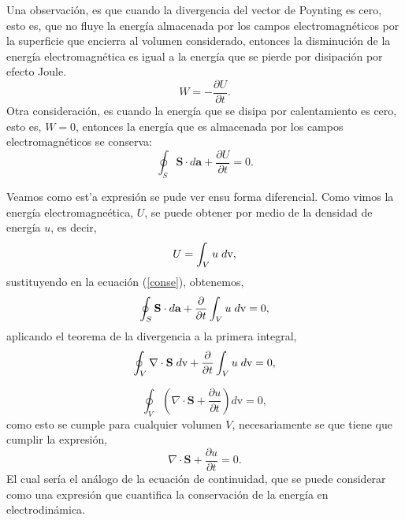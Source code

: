 \documentclass[11pt,fleqn]{book} %
\begin{document}
Una observaci\'on, es que cuando la divergencia del vector de Poynting es cero, esto es, que no fluye la energ\'ia almacenada por los campos electromagn\'eticos por la superficie que encierra al volumen considerado, entonces la disminuci\'on de la energ\'ia electromagn\'etica es igual a la energ\'ia que se pierde por disipaci\'on por efecto Joule.
\begin{equation}
W=-\frac{\partial U}{\partial t}.
\end{equation}
Otra consideraci\'on, es cuando la energ\'ia que se disipa por calentamiento es cero, esto es, $W=0$, entonces la energ\'ia que es almacenada por los campos electromagn\'eticos se conserva:
\begin{equation}
\oint_{S}\textbf{S}\cdot d\textbf{a}+\frac{\partial U}{\partial t}=0.\label{conse}
\end{equation}


\begin{obs}
 Veamos como est'a expresi\'on se pude ver ensu forma diferencial. Como vimos la energ\'ia electromagne\'etica, $U$, se puede obtener por medio de la densidad de energ\'ia $u$, es decir,
 \begin{equation*}
 U=\int_V u \hspace{1mm}d\text{v},
 \end{equation*}
sustituyendo en la ecuaci\'on (\ref{conse}), obtenemos,
 \begin{equation*}
\oint_{S}\textbf{S}\cdot d\textbf{a}+\frac{\partial }{\partial t}
 \int_V u \hspace{1mm}d\text{v}=0,
 \end{equation*}
aplicando el teorema de la divergencia a la primera integral,
 \begin{equation*}
\oint_{V}\nabla \cdot\textbf{S}\hspace{1mm}d\text{v}+\frac{\partial }{\partial t}
 \int_V u \hspace{1mm}d\text{v}=0,
 \end{equation*}

  \begin{equation*}
\oint_{V}\left(\nabla \cdot\textbf{S}+\frac{\partial u}{\partial t} \right)
  d\text{v}=0,
 \end{equation*}
como esto se cumple para cualquier volumen $V$, necesariamente se que tiene que cumplir la expresi\'on,
\begin{equation}
\nabla\cdot\textbf{S}+\frac{\partial u}{\partial t}=0.
 \end{equation}
 El cual ser\'ia el an\'alogo de la ecuaci\'on de continuidad, que se puede considerar como una expresi\'on que cuantifica la conservaci\'on de la energ\'ia en electrodin\'amica.
 \end{obs}
\end{document}
